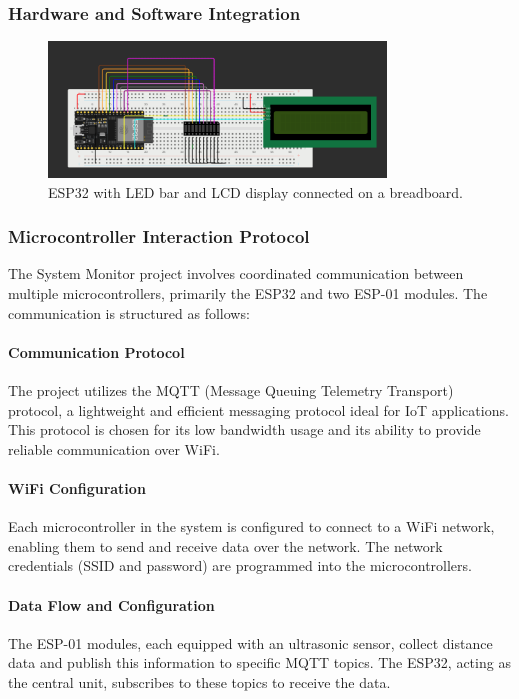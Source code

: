 \subsubsection{Hardware and Software Integration}
\begin{figure}[ht]
    \centering
    \includegraphics[width=0.8\textwidth]{../images/activity_monitor_scheme.png}
    \caption{ESP32 with LED bar and LCD display connected on a breadboard.}
    \label{fig:esp32_system_monitor}
\end{figure}

\subsubsection{Microcontroller Interaction Protocol}
The System Monitor project involves coordinated communication between multiple microcontrollers, primarily the ESP32 and two ESP-01 modules. The communication is structured as follows:

\paragraph{Communication Protocol}
The project utilizes the MQTT (Message Queuing Telemetry Transport) protocol, a lightweight and efficient messaging protocol ideal for IoT applications. This protocol is chosen for its low bandwidth usage and its ability to provide reliable communication over WiFi.

\paragraph{WiFi Configuration}
Each microcontroller in the system is configured to connect to a WiFi network, enabling them to send and receive data over the network. The network credentials (SSID and password) are programmed into the microcontrollers.

\paragraph{Data Flow and Configuration}
The ESP-01 modules, each equipped with an ultrasonic sensor, collect distance data and publish this information to specific MQTT topics. The ESP32, acting as the central unit, subscribes to these topics to receive the data.

